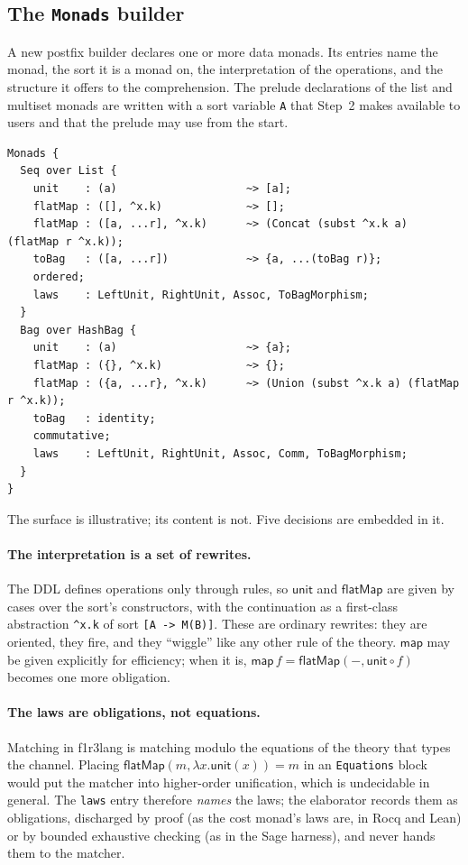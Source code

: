 \documentclass[11pt]{article}
\theoremstyle{branddef}
\theoremstyle{brandplain}
\theoremstyle{brandrem}
\newcommand{\unit}{\mathsf{unit}}
\newcommand{\fmap}{\mathsf{map}}
\newcommand{\bind}{\mathsf{flatMap}}
\newcommand{\flang}{\textsf{f1r3lang}}
\begin{document}
\subsection{The \texttt{Monads} builder}

A new postfix builder declares one or more data monads. Its entries name the
monad, the sort it is a monad on, the interpretation of the operations, and
the structure it offers to the comprehension. The prelude declarations of the
list and multiset monads are written with a sort variable \texttt{A} that
Step~2 makes available to users and that the prelude may use from the start.

\begin{lstlisting}[language=mettail]
Monads {
  Seq over List {
    unit    : (a)                    ~> [a];
    flatMap : ([], ^x.k)             ~> [];
    flatMap : ([a, ...r], ^x.k)      ~> (Concat (subst ^x.k a) (flatMap r ^x.k));
    toBag   : ([a, ...r])            ~> {a, ...(toBag r)};
    ordered;
    laws    : LeftUnit, RightUnit, Assoc, ToBagMorphism;
  }
  Bag over HashBag {
    unit    : (a)                    ~> {a};
    flatMap : ({}, ^x.k)             ~> {};
    flatMap : ({a, ...r}, ^x.k)      ~> (Union (subst ^x.k a) (flatMap r ^x.k));
    toBag   : identity;
    commutative;
    laws    : LeftUnit, RightUnit, Assoc, Comm, ToBagMorphism;
  }
}
\end{lstlisting}

The surface is illustrative; its content is not. Five decisions are embedded
in it.

\paragraph{The interpretation is a set of rewrites.} The DDL defines
operations only through rules, so \(\unit\) and \(\bind\) are given by cases
over the sort's constructors, with the continuation as a first-class
abstraction \verb|^x.k| of sort \verb|[A -> M(B)]|. These are ordinary
rewrites: they are oriented, they fire, and they ``wiggle'' like any other
rule of the theory. \(\fmap\) may be given explicitly for efficiency; when it
is, \(\fmap\,f = \bind(-, \unit\circ f)\) becomes one more obligation.

\paragraph{The laws are obligations, not equations.} Matching in \flang{} is
matching modulo the equations of the theory that types the channel. Placing
\(\bind(m, \lambda x.\unit(x)) = m\) in an \texttt{Equations} block would put
the matcher into higher-order unification, which is undecidable in general.
The \texttt{laws} entry therefore \emph{names} the laws; the elaborator records
them as obligations, discharged by proof (as the cost monad's laws are, in
Rocq and Lean) or by bounded exhaustive checking (as in the Sage harness), and
never hands them to the matcher.
\end{document}
